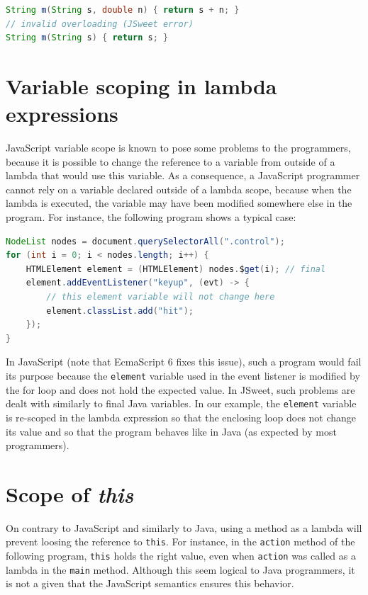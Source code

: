 \documentclass[a4paper]{report}
\begin{document}
\begin{lstlisting}[language=Java]
String m(String s, double n) { return s + n; }
// invalid overloading (JSweet error)
String m(String s) { return s; }
\end{lstlisting}


\section{Variable scoping in lambda expressions}

JavaScript variable scope is known to pose some problems to the programmers, because it is possible to change the reference to a variable from outside of a lambda that would use this variable. As a consequence, a JavaScript programmer cannot rely on a variable declared outside of a lambda scope, because when the lambda is executed, the variable may have been modified somewhere else in the program. For instance, the following program shows a typical case: 

\begin{lstlisting}[language=Java]
NodeList nodes = document.querySelectorAll(".control");
for (int i = 0; i < nodes.length; i++) {
	HTMLElement element = (HTMLElement) nodes.$get(i); // final
	element.addEventListener("keyup", (evt) -> {
	    // this element variable will not change here 
		element.classList.add("hit");
	});
}
\end{lstlisting}

In JavaScript (note that EcmaScript 6 fixes this issue), such a program would fail its purpose because the \texttt{element} variable used in the event listener is modified by the for loop and does not hold the expected value. In JSweet, such problems are dealt with similarly to final Java variables. In our example, the \texttt{element} variable is re-scoped in the lambda expression so that the enclosing loop does not change its value and so that the program behaves like in Java (as expected by most programmers).

\section{Scope of \emph{this}}

On contrary to JavaScript and similarly to Java, using a method as a lambda will prevent loosing the reference to \texttt{this}. For instance, in the \texttt{action} method of the following program, \texttt{this} holds the right value, even when \texttt{action} was called as a lambda in the \texttt{main} method. Although this seem logical to Java programmers, it is not a given that the JavaScript semantics ensures this behavior. 
\end{document}
